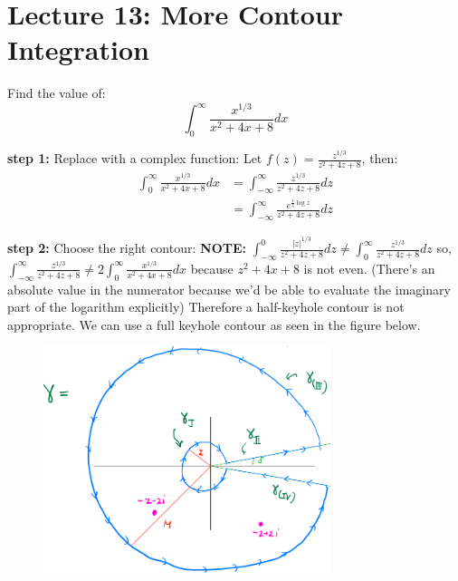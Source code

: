 \chapter{Lecture 13: More Contour Integration}

\begin{example}
    Find the value of:
    $$\int_{0}^{\infty} \frac{x^{1/3}}{x^2 + 4x + 8} dx$$

    \textbf{step 1:} Replace with a complex function:
    Let $f(z) = \frac{z^{1/3}}{z^2 + 4z + 8}$, then:
    \begin{align*}
        \int_{0}^{\infty} \frac{x^{1/3}}{x^2 + 4x + 8} dx & = \int_{-\infty}^{\infty} \frac{z^{1/3}}{z^2 + 4z + 8} dz             \\
                                                          & = \int_{-\infty}^{\infty} \frac{e^{\frac{1}3\log z}}{z^2 + 4z + 8} dz
    \end{align*}

    \textbf{step 2:} Choose the right contour:
    \textbf{NOTE: } $\int_{-\infty}^{0} \frac{|z|^{1/3}}{z^2 + 4z + 8} dz \neq \int_{0}^{\infty} \frac{z^{1/3}}{z^2 + 4z + 8} dz$ so, $\int_{-\infty}^{\infty} \frac{z^{1/3}}{z^2 + 4z + 8} \neq 2\int_{0}^{\infty} \frac{x^{1/3}}{x^2 + 4x + 8} dx$ because $z^2 + 4x + 8$ is not even.
    (There's an absolute value in the numerator because we'd be able to evaluate the imaginary part of the logarithm explicitly)
    Therefore a half-keyhole contour is not appropriate. We can use a full keyhole contour as seen in the figure below.

    \begin{figure}[H]
        \centering
        \includegraphics[width=0.75\textwidth]{LECTURE_13/keyhole-contour.png}
    \end{figure}


\end{example}
